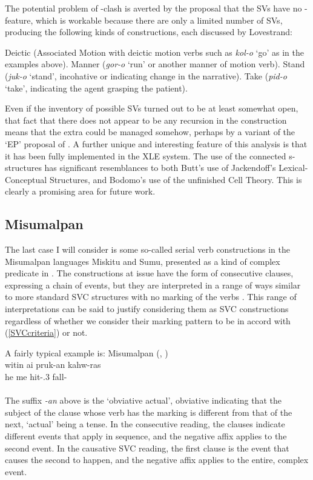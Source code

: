 \documentclass[output=paper,hidelinks]{langscibook}
\begin{document}
The potential problem of {\PRED}-clash is averted by the proposal that the SVs have
no {\PRED}-feature, which is workable because there are only a limited number of SVs,
producing the following kinds of constructions, each discussed by Lovestrand:
\ea
\begin{xlist}
\ex Deictic (Associated Motion with deictic motion verbs such as \emph{kol-o} `go' as in
the examples above).
\ex Manner (\emph{gor-o} `run' or another manner of motion verb).
\ex Stand (\emph{juk-o} `stand', incohative or indicating change in the narrative).
\ex Take (\emph{pid-o} `take', indicating the agent grasping the patient).
\end{xlist}
\z
Even if the inventory of possible SVs turned out to be at least somewhat open,
that fact that there does not appear to be any recursion in the construction
means that the extra {\PRED} could be managed somehow, perhaps by a variant
of the `EP' proposal of \citet{Lovestrand2020}.  A further unique and interesting
feature of this analysis is that it has been fully implemented in the XLE system.
The use of the connected s-structures has significant resemblances to both Butt's
use of Jackendoff's Lexical-Conceptual Structures, and Bodomo's use of the
unfinished Cell Theory.  This is clearly a promising area for future work.


\subsection{Misumalpan}
The last case I will consider is some so-called serial verb constructions in the Misumalpan
languages Miskitu and Sumu, presented as a kind of complex predicate in \citet{AndrewsManning1999}.
The constructions at issue have the form of consecutive clauses, expressing a chain of events,
but they are interpreted in a range of ways similar to more standard SVC structures
with no marking of the verbs \citep{Salamanca1988}. This range of interpretations can be
said to justify considering them as SVC constructions regardless of whether we consider
their marking pattern to be in accord with (\ref{SVCcriteria}) or not.

A fairly typical example is:
\ea Misumalpan (\citealt[26]{Hale1991}, \citealt[93]{AndrewsManning1999})\\
\gll witin ai pruk-an kahw-ras\\
he me hit-{.3} fall-{\NEG}\\
\\
\z
The suffix \emph{-an} above is the `obviative actual', obviative indicating that the subject of the clause whose
verb has the marking is different from that of the next, `actual' being a tense.
In the consecutive reading, the clauses indicate different events that apply in
sequence, and the negative affix applies to the second event.  In the causative SVC reading,
the first clause is the event that causes the second to happen, and the negative affix applies
to the entire, complex event.
\end{document}
